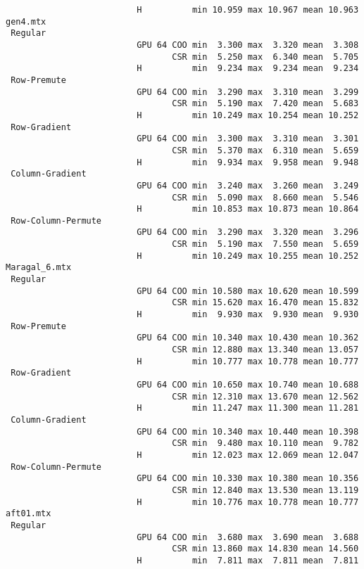 {\begin{verbatim}
                          H          min 10.959 max 10.967 mean 10.963
gen4.mtx
 Regular
                          GPU 64 COO min  3.300 max  3.320 mean  3.308
                                 CSR min  5.250 max  6.340 mean  5.705
                          H          min  9.234 max  9.234 mean  9.234
 Row-Premute
                          GPU 64 COO min  3.290 max  3.310 mean  3.299
                                 CSR min  5.190 max  7.420 mean  5.683
                          H          min 10.249 max 10.254 mean 10.252
 Row-Gradient
                          GPU 64 COO min  3.300 max  3.310 mean  3.301
                                 CSR min  5.370 max  6.310 mean  5.659
                          H          min  9.934 max  9.958 mean  9.948
 Column-Gradient
                          GPU 64 COO min  3.240 max  3.260 mean  3.249
                                 CSR min  5.090 max  8.660 mean  5.546
                          H          min 10.853 max 10.873 mean 10.864
 Row-Column-Permute
                          GPU 64 COO min  3.290 max  3.320 mean  3.296
                                 CSR min  5.190 max  7.550 mean  5.659
                          H          min 10.249 max 10.255 mean 10.252
Maragal_6.mtx
 Regular
                          GPU 64 COO min 10.580 max 10.620 mean 10.599
                                 CSR min 15.620 max 16.470 mean 15.832
                          H          min  9.930 max  9.930 mean  9.930
 Row-Premute
                          GPU 64 COO min 10.340 max 10.430 mean 10.362
                                 CSR min 12.880 max 13.340 mean 13.057
                          H          min 10.777 max 10.778 mean 10.777
 Row-Gradient
                          GPU 64 COO min 10.650 max 10.740 mean 10.688
                                 CSR min 12.310 max 13.670 mean 12.562
                          H          min 11.247 max 11.300 mean 11.281
 Column-Gradient
                          GPU 64 COO min 10.340 max 10.440 mean 10.398
                                 CSR min  9.480 max 10.110 mean  9.782
                          H          min 12.023 max 12.069 mean 12.047
 Row-Column-Permute
                          GPU 64 COO min 10.330 max 10.380 mean 10.356
                                 CSR min 12.840 max 13.530 mean 13.119
                          H          min 10.776 max 10.778 mean 10.777
aft01.mtx
 Regular
                          GPU 64 COO min  3.680 max  3.690 mean  3.688
                                 CSR min 13.860 max 14.830 mean 14.560
                          H          min  7.811 max  7.811 mean  7.811

\end{verbatim}}
